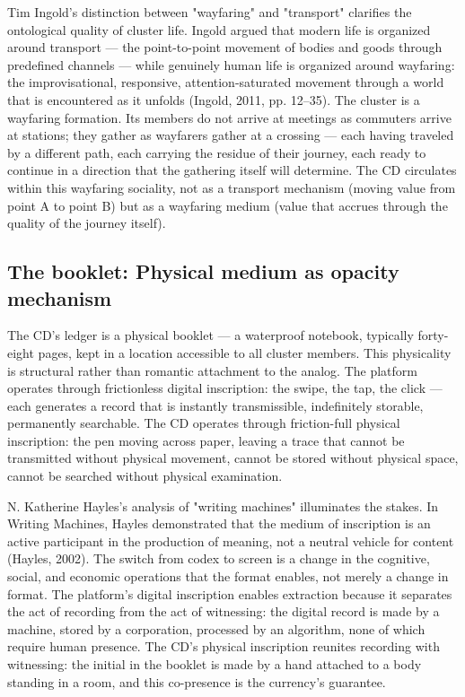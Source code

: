 Tim Ingold's distinction between "wayfaring" and "transport" clarifies the ontological quality of cluster life. Ingold argued that modern life is organized around transport — the point-to-point movement of bodies and goods through predefined channels — while genuinely human life is organized around wayfaring: the improvisational, responsive, attention-saturated movement through a world that is encountered as it unfolds (Ingold, 2011, pp. 12–35). The cluster is a wayfaring formation. Its members do not arrive at meetings as commuters arrive at stations; they gather as wayfarers gather at a crossing — each having traveled by a different path, each carrying the residue of their journey, each ready to continue in a direction that the gathering itself will determine. The CD circulates within this wayfaring sociality, not as a transport mechanism (moving value from point A to point B) but as a wayfaring medium (value that accrues through the quality of the journey itself).

\subsection{The booklet: Physical medium as opacity mechanism}

The CD's ledger is a physical booklet — a waterproof notebook, typically forty-eight pages, kept in a location accessible to all cluster members. This physicality is structural rather than romantic attachment to the analog. The platform operates through frictionless digital inscription: the swipe, the tap, the click — each generates a record that is instantly transmissible, indefinitely storable, permanently searchable. The CD operates through friction-full physical inscription: the pen moving across paper, leaving a trace that cannot be transmitted without physical movement, cannot be stored without physical space, cannot be searched without physical examination.

N. Katherine Hayles's analysis of "writing machines" illuminates the stakes. In Writing Machines, Hayles demonstrated that the medium of inscription is an active participant in the production of meaning, not a neutral vehicle for content (Hayles, 2002). The switch from codex to screen is a change in the cognitive, social, and economic operations that the format enables, not merely a change in format. The platform's digital inscription enables extraction because it separates the act of recording from the act of witnessing: the digital record is made by a machine, stored by a corporation, processed by an algorithm, none of which require human presence. The CD's physical inscription reunites recording with witnessing: the initial in the booklet is made by a hand attached to a body standing in a room, and this co-presence is the currency's guarantee.

